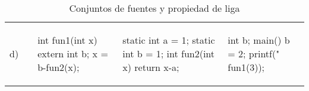 \begin{table}
\begin{tabular}{p{0.2cm}|p{3cm}|p{3.5cm}|p{3.5cm}|p{3cm}}
d)
&
\begin{codecell}

\end{codecell}
&
\begin{codecell}
int fun1(int x)
{
	extern int b;
	x = b-fun2(x);
}
\end{codecell}
&
\begin{codecell}
static int 
	a = 1;
static int 
	b = 1;
int fun2(int x) 
{
	return x-a;
}
\end{codecell}
&
\begin{codecell}
int b;
main()
{
	b = 2;
	printf("%
		fun1(3));
}
\end{codecell}\\

\end{tabular}
\caption{Conjuntos de fuentes y propiedad de liga}
\label{tab:fuentes}
\end{table}
